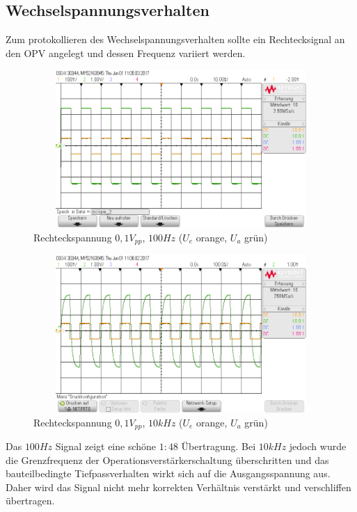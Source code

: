 \subsection{Wechselspannungsverhalten}

Zum protokollieren des Wechselspannungsverhalten sollte ein Rechtecksignal an den OPV angelegt und dessen Frequenz variiert
werden.\\

\begin{figure}[H]
 \begin{center}
  \includegraphics[height=6cm,width=12cm]{OsziBilder/nichtInvVer_100Hz}
 \end{center}
 \caption{Rechteckspannung $0,1V_{pp}$, $100Hz$ ($U_e$ orange, $U_a$ grün)}
\end{figure}

\begin{figure}[H]
 \begin{center}
  \includegraphics[height=6cm,width=12cm]{OsziBilder/nichtInvVer_10kHz}
 \end{center}
 \caption{Rechteckspannung $0,1V_{pp}$, $10kHz$ ($U_e$ orange, $U_a$ grün)}
\end{figure}
\noindent
Das $100Hz$ Signal zeigt eine schöne $1:48$ Übertragung. Bei $10kHz$ jedoch
wurde die Grenzfrequenz der Operationsverstärkerschaltung überschritten und das bauteilbedingte Tiefpassverhalten wirkt sich
auf die Ausgangsspannung aus. Daher wird das Signal nicht mehr korrekten Verhältnis verstärkt und verschliffen übertragen.\\
